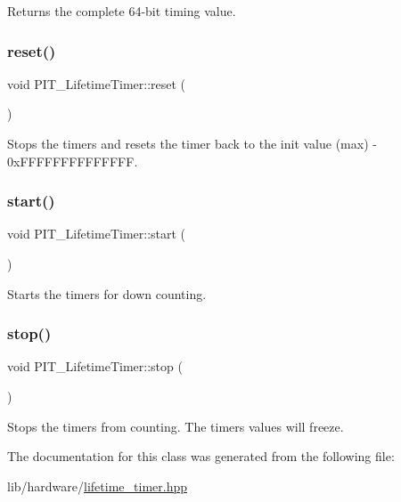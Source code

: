 Returns the complete 64-\/bit timing value. 

\mbox{\label{classPIT__LifetimeTimer_a5c1c38cfa6c7a049a495ee3d89e13276}} 
\subsubsection{\texorpdfstring{reset()}{reset()}}
{\footnotesize\ttfamily void P\+I\+T\+\_\+\+Lifetime\+Timer\+::reset (\begin{DoxyParamCaption}{ }\end{DoxyParamCaption})\hspace{0.3cm}{\ttfamily [inline]}}



Stops the timers and resets the timer back to the init value (max) -\/ 0x\+F\+F\+F\+F\+F\+F\+F\+F\+F\+F\+F\+F\+FF. 

\mbox{\label{classPIT__LifetimeTimer_a6feabeff2529cabaf27ef53d027a4fc9}} 
\subsubsection{\texorpdfstring{start()}{start()}}
{\footnotesize\ttfamily void P\+I\+T\+\_\+\+Lifetime\+Timer\+::start (\begin{DoxyParamCaption}{ }\end{DoxyParamCaption})\hspace{0.3cm}{\ttfamily [inline]}}



Starts the timers for down counting. 

\mbox{\label{classPIT__LifetimeTimer_a92543f292044725b1dea4d009e01d9e4}} 
\subsubsection{\texorpdfstring{stop()}{stop()}}
{\footnotesize\ttfamily void P\+I\+T\+\_\+\+Lifetime\+Timer\+::stop (\begin{DoxyParamCaption}{ }\end{DoxyParamCaption})\hspace{0.3cm}{\ttfamily [inline]}}



Stops the timers from counting. The timers values will freeze. 



The documentation for this class was generated from the following file\+:\begin{DoxyCompactItemize}
\item 
lib/hardware/\hyperlink{lifetime__timer_8hpp}{lifetime\+\_\+timer.\+hpp}\end{DoxyCompactItemize}
